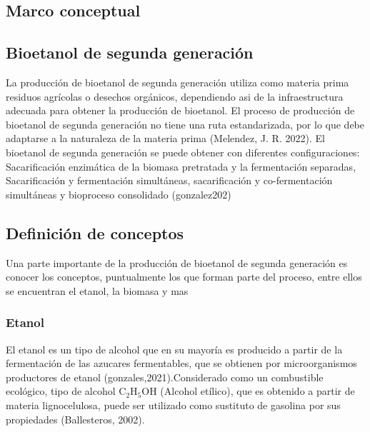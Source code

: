 \documentclass[12pt]{article}
\begin{document}
\cleardoublepage


\begin{appendix}




		\section{Marco conceptual}
		\label{marco conceptual}
		\subsection{Bioetanol de segunda generación}
		La producción de bioetanol de segunda generación utiliza como materia prima residuos agrícolas o desechos orgánicos, dependiendo asi de la infraestructura adecuada para obtener la producción de bioetanol. El proceso de producción de bioetanol de segunda generación no tiene una ruta estandarizada, por lo que debe adaptarse a la naturaleza de la materia prima \cite{melendez2022biotecnologia} (Melendez, J. R. 2022). El bioetanol de segunda generación se puede obtener con diferentes configuraciones: Sacarificación enzimática de la biomasa pretratada y la fermentación separadas, Sacarificación y fermentación simultáneas, sacarificación y co-fermentación simultáneas y bioproceso consolidado (gonzalez202)
		
		\subsection{Definición de conceptos }
		Una parte  importante de la producción de bioetanol de segunda generación es conocer los conceptos, puntualmente los que forman parte del proceso, entre ellos se encuentran el etanol, la biomasa y mas 
		\subsubsection{Etanol}
		El etanol es un tipo de alcohol que en su mayoría es producido a partir de la  fermentación de las azucares fermentables, que se obtienen por microorganismos productores de etanol \cite{} (gonzales,2021).Considerado como un combustible ecológico, tipo de alcohol $\text{C}_2\text{H}_5\text{OH}$ (Alcohol etílico), que es obtenido a partir de materia lignocelulosa, puede ser utilizado como sustituto de gasolina por sus propiedades (Ballesteros, 2002).
		

\end{appendix}
\end{document}
